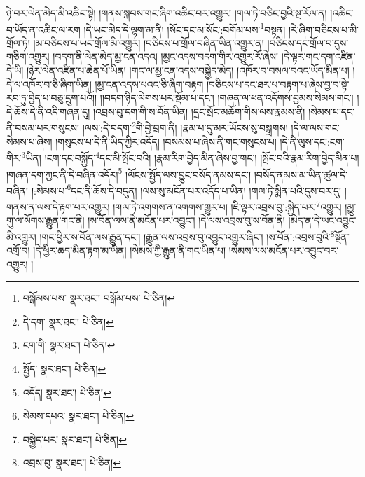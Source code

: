 ཉེ་བར་ལེན་མེད་མི་འཆིང་སྟེ། །གནས་སྐབས་གང་ཞིག་འཆིང་བར་འགྱུར། །གལ་ཏེ་བཅིང་བྱའི་སྔ་རོལ་ན། །འཆིང་བ་ཡོད་ན་འཆིང་ལ་རག །དེ་ཡང་མེད་དེ་ལྷག་མ་ནི། །སོང་དང་མ་སོང་:བགོམ་པས་\footnote{བསྒོམས་པས་  སྣར་ཐང་། བསྒོམ་པས་  པེ་ཅིན། }བསྟན། །རེ་ཞིག་བཅིངས་པ་མི་གྲོལ་ཏེ། །མ་བཅིངས་པ་ཡང་གྲོལ་མི་འགྱུར། །བཅིངས་པ་གྲོལ་བཞིན་ཡིན་འགྱུར་ན། །བཅིངས་དང་གྲོལ་བ་དུས་གཅིག་འགྱུར། །བདག་ནི་ལེན་མེད་མྱ་ངན་འདའ། །མྱང་འདས་བདག་གིར་འགྱུར་རོ་ཞེས། །དེ་ལྟར་གང་དག་འཛིན་དེ་ཡི། །ཉེར་ལེན་འཛིན་པ་ཆེན་པོ་ཡིན། །གང་ལ་མྱ་ངན་འདས་བསྐྱེད་མེད། །འཁོར་བ་བསལ་བའང་ཡོད་མིན་པ། །དེ་ལ་འཁོར་བ་ཅི་ཞིག་ཡིན། །མྱ་ངན་འདས་པའང་ཅི་ཞིག་བརྟག །བཅིངས་པ་དང་ཐར་པ་བརྟག་པ་ཞེས་བྱ་བ་སྟེ་རབ་ཏུ་བྱེད་པ་བཅུ་དྲུག་པའོ།། །།བདག་ཉིད་ལེགས་པར་སྡོམ་པ་དང་། །གཞན་ལ་ཕན་འདོགས་བྱམས་སེམས་གང་། །དེ་ཆོས་དེ་ནི་འདི་གཞན་དུ། །འབྲས་བུ་དག་གི་ས་བོན་ཡིན། །དྲང་སྲོང་མཆོག་གིས་ལས་རྣམས་ནི། །སེམས་པ་དང་ནི་བསམ་པར་གསུངས། །ལས་:དེ་བདག་\footnote{དེ་དག་  སྣར་ཐང་།  པེ་ཅིན། }གི་བྱེ་བྲག་ནི། །རྣམ་པ་དུ་མར་ཡོངས་སུ་བསྒྲགས། །དེ་ལ་ལས་གང་སེམས་པ་ཞེས། །གསུངས་པ་དེ་ནི་ཡིད་ཀྱིར་འདོད། །བསམས་པ་ཞེས་ནི་གང་གསུངས་པ། །དེ་ནི་ལུས་དང་:ངག་གིར་\footnote{ངག་གི་  སྣར་ཐང་།  པེ་ཅིན། }ཡིན། །ངག་དང་བསྐྱོད་\footnote{སྤྱོད་  སྣར་ཐང་།  པེ་ཅིན། }དང་མི་སྤོང་བའི། །རྣམ་རིག་བྱེད་མིན་ཞེས་བྱ་གང་། །སྤོང་བའི་རྣམ་རིག་བྱེད་མིན་པ། །གཞན་དག་ཀྱང་ནི་དེ་བཞིན་འདོར།\footnote{འདོད།  སྣར་ཐང་།  པེ་ཅིན། } །ལོངས་སྤྱོད་ལས་བྱུང་བསོད་ནམས་དང་། །བསོད་ནམས་མ་ཡིན་ཚུལ་དེ་བཞིན། །:སེམས་པ་\footnote{སེམས་དཔའ་  སྣར་ཐང་།  པེ་ཅིན། }དང་ནི་ཆོས་དེ་བདུན། །ལས་སུ་མངོན་པར་འདོད་པ་ཡིན། །གལ་ཏེ་སྨིན་པའི་དུས་བར་དུ། །གནས་ན་ལས་དེ་རྟག་པར་འགྱུར། །གལ་ཏེ་འགགས་ན་འགགས་གྱུར་པ། །ཇི་ལྟར་འབྲས་བུ་:སྐྱེད་པར་\footnote{བསྐྱེད་པར་  སྣར་ཐང་།  པེ་ཅིན། }འགྱུར། །མྱུ་གུ་ལ་སོགས་རྒྱུན་གང་ནི། །ས་བོན་ལས་ནི་མངོན་པར་འབྱུང་། །དེ་ལས་འབྲས་བུ་ས་བོན་ནི། །མེད་ན་དེ་ཡང་འབྱུང་མི་འགྱུར། །གང་ཕྱིར་ས་བོན་ལས་རྒྱུན་དང་། །རྒྱུན་ལས་འབྲས་བུ་འབྱུང་འགྱུར་ཞིང་། །ས་བོན་:འབྲས་བུའི་\footnote{འབྲས་བུ་  སྣར་ཐང་།  པེ་ཅིན། }སྔོན་འགྲོ་བ། །དེ་ཕྱིར་ཆད་མིན་རྟག་མ་ཡིན། །སེམས་ཀྱི་རྒྱུན་ནི་གང་ཡིན་པ། །སེམས་ལས་མངོན་པར་འབྱུང་བར་འགྱུར། །
